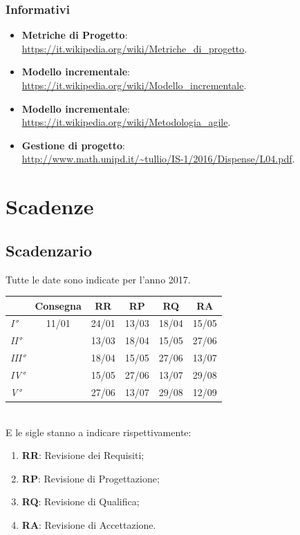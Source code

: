 \documentclass[12pt,a4paper,titlepage]{article}
\begin{document}
\subsubsection{Informativi}
\begin{itemize}
	\item \textbf{Metriche di Progetto}: \\
	\textcolor{blue}{\url{https://it.wikipedia.org/wiki/Metriche_di_progetto}}.
	\item \textbf{Modello incrementale}: \\
	\textcolor{blue}{\url{https://it.wikipedia.org/wiki/Modello_incrementale}}.
	\item \textbf{Modello incrementale}: \\
	\textcolor{blue}{\url{https://it.wikipedia.org/wiki/Metodologia_agile}}.
	\item \textbf{Gestione di progetto}: \\
	\textcolor{blue}{\url{http://www.math.unipd.it/~tullio/IS-1/2016/Dispense/L04.pdf}}.
\end{itemize}

\newpage

\section{Scadenze}
\subsection{Scadenzario}
Tutte le date sono indicate per l'anno 2017.\\

{\renewcommand\arraystretch{1.2} %
\begin{tabular}{|l|c|c|c|c|c|}
\hline
 & Consegna & \textbf{RR} & \textbf{RP} & \textbf{RQ} & \textbf{RA} \\
\hline
\textit{I°} & 11/01 & 24/01 & 13/03 & 18/04 & 15/05 \\
\textit{II°} & & 13/03 & 18/04 & 15/05 & 27/06 \\
\textit{III°} & & 18/04 & 15/05 & 27/06 & 13/07 \\
\textit{IV°} & & 15/05 & 27/06 & 13/07 & 29/08 \\
\textit{V°} & & 27/06 & 13/07 & 29/08 & 12/09 \\
\hline
\end{tabular}}
\vspace{0.5cm}
\\
E le sigle stanno a indicare rispettivamente:
\begin{enumerate}
	\item \textbf{RR}: Revisione dei Requisiti;
	\item \textbf{RP}: Revisione di Progettazione;
	\item \textbf{RQ}: Revisione di Qualifica;
	\item \textbf{RA}: Revisione di Accettazione. 
\end{enumerate}
\end{document}

